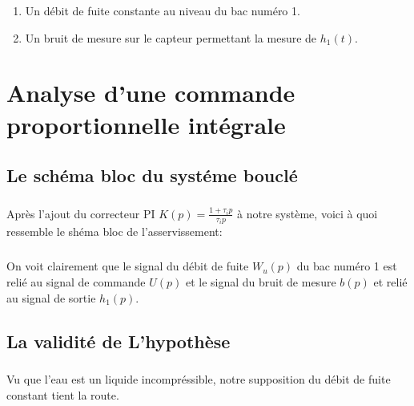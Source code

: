 \documentclass[12pt, a4paper, openany]{report}
\begin{document}
  \begin{enumerate}
      \item Un débit de fuite constante au niveau du bac numéro 1.
      \item Un bruit de mesure sur le capteur permettant la mesure de $h_{1}(t)$.
  \end{enumerate}
   
    
   
   

\chapter{Analyse d'une commande proportionnelle intégrale}

 \section{Le schéma bloc du systéme bouclé} 

\paragraph{}
	Après l'ajout du correcteur PI $K(p)=\frac {1+\tau_{i}p}{\tau_{i}p}$ à notre système, voici à quoi ressemble le       shéma bloc de l'asservissement:
  \begin{center}
    \label{fig2}
  \end{center}    
 
 \paragraph{}
	On voit clairement que le signal du débit de fuite $W_{u}(p)$ du bac numéro 1 est relié au signal de commande $U(p)$ et le signal du bruit de mesure $b(p)$ et relié au signal de sortie $h_{1}(p)$.    
	
 \section{La validité de L'hypothèse} 
  
 \paragraph{}       
	Vu que l'eau est un liquide incompréssible, notre supposition du débit de fuite constant tient la route.
	
\end{document}

